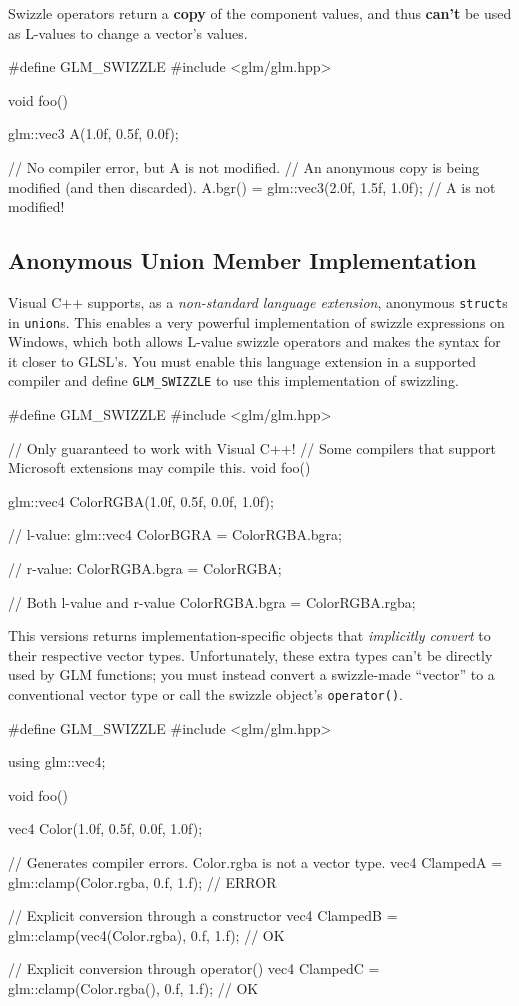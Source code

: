 \documentclass{scrartcl}
\numberwithin{figure}{subsection}
\begin{document}
Swizzle operators return a \textbf{copy} of the component values, and thus \textbf{can't} be used as L-values to change a vector's values.

\begin{cppcode}
#define GLM_SWIZZLE 
#include <glm/glm.hpp>

void foo()
{
  glm::vec3 A(1.0f, 0.5f, 0.0f);

  // No compiler error, but A is not modified.
  // An anonymous copy is being modified (and then discarded).
  A.bgr() = glm::vec3(2.0f, 1.5f, 1.0f); // A is not modified!
}
\end{cppcode}


\subsection{Anonymous Union Member Implementation}

Visual C++ supports, as a \emph{non-standard language extension}, anonymous \verb|struct|s in \verb|union|s. This enables a very powerful implementation of swizzle expressions on Windows, which both allows L-value swizzle operators and makes the syntax for it closer to GLSL's.  You must enable this language extension in a supported compiler and define \verb|GLM_SWIZZLE| to use this implementation of swizzling.

\begin{cppcode}
#define GLM_SWIZZLE 
#include <glm/glm.hpp>

// Only guaranteed to work with Visual C++!
// Some compilers that support Microsoft extensions may compile this.
void foo()
{
  glm::vec4 ColorRGBA(1.0f, 0.5f, 0.0f, 1.0f);

  // l-value:
  glm::vec4 ColorBGRA = ColorRGBA.bgra;

  // r-value:
  ColorRGBA.bgra = ColorRGBA;

  // Both l-value and r-value
  ColorRGBA.bgra = ColorRGBA.rgba;
}
\end{cppcode}

This versions returns implementation-specific objects that \emph{implicitly convert} to their respective vector types.  Unfortunately, these extra types can't be directly used by GLM functions; you must instead convert a swizzle-made \enquote{vector} to a conventional vector type or call the swizzle object's \verb|operator()|.

\begin{cppcode}
#define GLM_SWIZZLE 
#include <glm/glm.hpp>

using glm::vec4;

void foo()
{
  vec4 Color(1.0f, 0.5f, 0.0f, 1.0f);

  // Generates compiler errors. Color.rgba is not a vector type.
  vec4 ClampedA = glm::clamp(Color.rgba, 0.f, 1.f); // ERROR 

  // Explicit conversion through a constructor
  vec4 ClampedB = glm::clamp(vec4(Color.rgba), 0.f, 1.f); // OK

  // Explicit conversion through operator()
  vec4 ClampedC = glm::clamp(Color.rgba(), 0.f, 1.f); // OK
}
\end{cppcode}
\end{document}
